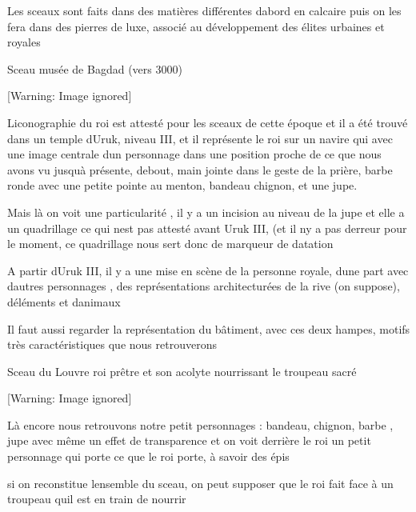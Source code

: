 \documentclass{article}
\begin{document}
Les sceaux sont faits dans des matières différentes
d{\textquotesingle}abord en calcaire puis on les fera dans des pierres
de luxe, associé  au développement des élites urbaines et royales

Sceau musée de Bagdad  (vers 3000)

  [Warning: Image ignored] %
 

L{\textquotesingle}iconographie du roi est attesté pour les sceaux de
cette époque  et il a été trouvé dans un temple
d{\textquotesingle}Uruk, niveau III, et il représente le roi sur un
navire qui avec une image centrale d{\textquotesingle}un personnage
dans une position proche de ce que nous avons vu
jusqu{\textquotesingle}à présente, debout, main jointe dans le geste de
la prière, barbe ronde avec une petite pointe au menton,  bandeau
chignon, et une jupe.

Mais là on voit une particularité , il y a un incision au niveau de la
jupe et elle a un quadrillage ce qui n{\textquotesingle}est pas attesté
avant Uruk III, (et il n{\textquotesingle}y a pas
d{\textquotesingle}erreur pour le moment, ce quadrillage nous sert donc
de marqueur de datation

A partir d{\textquotesingle}Uruk III, il y a une mise en scène de la
personne royale, d{\textquotesingle}une part avec
d{\textquotesingle}autres personnages , des représentations
architecturées de la rive (on suppose), d{\textquotesingle}éléments et
d{\textquotesingle}animaux

Il faut aussi regarder la représentation du bâtiment, avec ces deux
hampes, motifs très caractéristiques que nous retrouverons

Sceau du Louvre  roi prêtre et son acolyte nourrissant le troupeau sacré

  [Warning: Image ignored] %
 

Là encore nous retrouvons notre petit personnages  : bandeau, chignon,
barbe , jupe avec même un effet de transparence et on voit derrière le
roi un petit personnage qui porte ce que le roi porte, à savoir des
épis

si on reconstitue l{\textquotesingle}ensemble du sceau,  on peut
supposer que le roi fait face à un troupeau qu{\textquotesingle}il est
en train de nourrir
\end{document}
